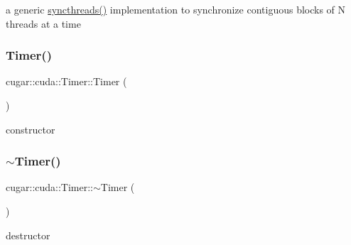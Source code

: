 a generic \hyperlink{group___c_u_d_a_module_ga7cd39b01cdfc18283bcd4bee3fabcaf9}{syncthreads()} implementation to synchronize contiguous blocks of N threads at a time \mbox{\label{group___c_u_d_a_module_ga27675d4d89a40e592d9f85789d951604}} 
\subsubsection{\texorpdfstring{Timer()}{Timer()}}
{\footnotesize\ttfamily cugar\+::cuda\+::\+Timer\+::\+Timer (\begin{DoxyParamCaption}{ }\end{DoxyParamCaption})\hspace{0.3cm}{\ttfamily [inline]}}

constructor \mbox{\label{group___c_u_d_a_module_gae7e683c7100a98ed350987e39e221c67}} 
\subsubsection{\texorpdfstring{$\sim$\+Timer()}{~Timer()}}
{\footnotesize\ttfamily cugar\+::cuda\+::\+Timer\+::$\sim$\+Timer (\begin{DoxyParamCaption}{ }\end{DoxyParamCaption})\hspace{0.3cm}{\ttfamily [inline]}}

destructor 